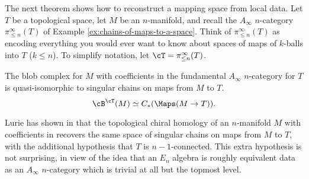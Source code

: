 The next theorem shows how to reconstruct a mapping space from local data.
Let $T$ be a topological space, let $M$ be an $n$-manifold, 
and recall the $A_\infty$ $n$-category $\pi^\infty_{\leq n}(T)$ 
of Example \ref{ex:chains-of-maps-to-a-space}.
Think of $\pi^\infty_{\leq n}(T)$ as encoding everything you would ever
want to know about spaces of maps of $k$-balls into $T$ ($k\le n$).
To simplify notation, let $\cT = \pi^\infty_{\leq n}(T)$.

\begin{thm} \label{thm:map-recon}
The blob complex for $M$ with coefficients in the fundamental $A_\infty$ $n$-category for $T$ is quasi-isomorphic to singular chains on maps from $M$ to $T$.
$$\cB^\cT(M) \simeq C_*(\Maps(M\to T)).$$
\end{thm}
\begin{rem}
Lurie has shown in \cite{0911.0018} that the topological chiral homology of an $n$-manifold $M$ with coefficients in  recovers  the same space of singular chains on maps from $M$ to $T$, with the additional hypothesis that $T$ is $n-1$-connected. This extra hypothesis is not surprising, in view of the idea that an $E_n$ algebra is roughly equivalent data as an $A_\infty$ $n$-category which is trivial at all but the topmost level.
\end{rem}

